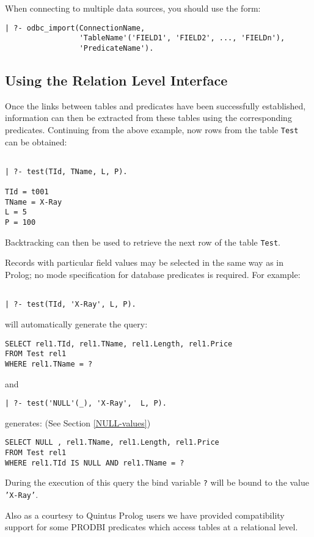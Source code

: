 When connecting to multiple data sources, you should use the form:
\begin{verbatim}
| ?- odbc_import(ConnectionName,
                 'TableName'('FIELD1', 'FIELD2', ..., 'FIELDn'),
                 'PredicateName').
\end{verbatim}


\subsection{Using the Relation Level Interface}

Once the links between tables and predicates have been successfully established, 
information can then be extracted from these tables using the corresponding 
predicates.   Continuing from the above example, now rows from the table 
{\tt Test} can be obtained:
\begin{verbatim}

| ?- test(TId, TName, L, P).

TId = t001
TName = X-Ray
L = 5
P = 100 
\end{verbatim}

Backtracking can then be used to retrieve the next row of the table {\tt Test}.

Records with particular field values may be selected in the same way
as in Prolog; no mode specification for database predicates is
required. For example:
\begin{verbatim}

| ?- test(TId, 'X-Ray', L, P).
\end{verbatim}
will automatically generate the query:
\begin{verbatim}
SELECT rel1.TId, rel1.TName, rel1.Length, rel1.Price
FROM Test rel1
WHERE rel1.TName = ?
\end{verbatim}
and 
\begin{verbatim}
| ?- test('NULL'(_), 'X-Ray',  L, P).
\end{verbatim}
generates: (See Section \ref{NULL-values})
\begin{verbatim}
SELECT NULL , rel1.TName, rel1.Length, rel1.Price
FROM Test rel1
WHERE rel1.TId IS NULL AND rel1.TName = ?
\end{verbatim}

During the execution of this query the bind variable {\tt ?} will be bound
to the value {\tt 'X-Ray'}.\newline

Also as a courtesy to Quintus Prolog users we have provided
compatibility support for some PRODBI predicates which access tables
at a relational level.


